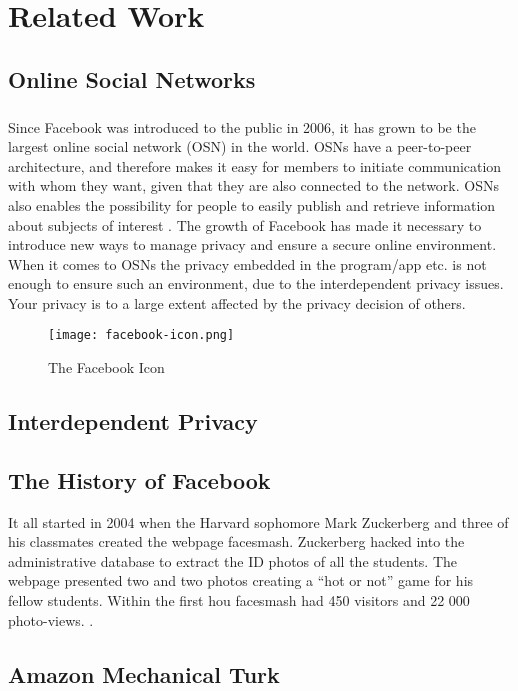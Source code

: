 \chapter{Related Work}
\label{chp:relatedwork} 


\section{Online Social Networks}
\paragraph{}
Since Facebook was introduced to the public in 2006, it has grown to be the largest online social network (OSN) in the world. OSNs have a peer-to-peer architecture, and therefore makes it easy for members to initiate communication with whom they want, given that they are also connected to the network. OSNs also enables the possibility for people to easily publish and retrieve information about subjects of interest \cite{DPBook}. The growth of Facebook has made it necessary to introduce new ways to manage privacy and ensure a secure online environment. When it comes to OSNs the privacy embedded in the program/app etc. is not enough to ensure such an environment, due to the interdependent privacy issues. Your privacy is to a large extent affected by the privacy decision of others.

\begin{figure}[h!]
\centering
\texttt{[image: facebook-icon.png]}
\caption{The Facebook Icon}
\end{figure}



\section{Interdependent Privacy}


\section{The History of Facebook}
It all started in 2004 when the Harvard sophomore Mark Zuckerberg and three of his classmates created the webpage facesmash. Zuckerberg hacked into the administrative database to extract the ID photos of all the students. The webpage presented two and two photos creating a “hot or not” game for his fellow students. Within the first hou facesmash had 450 visitors and 22 000 photo-views. \cite{FacebookHistory}.


\section{Amazon Mechanical Turk}


